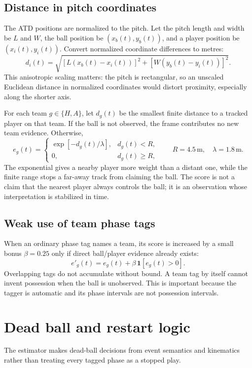 \documentclass[11pt,a4paper]{article}
\begin{document}
\subsection{Distance in pitch coordinates}

The ATD positions are normalized to the pitch. Let the pitch length and width be $L$ and $W$, the
ball position be $(x_b(t),y_b(t))$, and a player position be $(x_i(t),y_i(t))$. Convert normalized
coordinate differences to metres:
\[
  d_i(t)=\sqrt{\left[L(x_b(t)-x_i(t))\right]^2+
                   \left[W(y_b(t)-y_i(t))\right]^2}.
\]
This anisotropic scaling matters: the pitch is rectangular, so an unscaled Euclidean distance in
normalized coordinates would distort proximity, especially along the shorter axis.

For each team $g\in\{H,A\}$, let $d_g(t)$ be the smallest finite distance to a tracked player on
that team. If the ball is not observed, the frame contributes no new team evidence. Otherwise,
\[
  e_g(t)=\begin{cases}
    \exp[-d_g(t)/\lambda], & d_g(t)<R,\\
    0, & d_g(t)\ge R,
  \end{cases}
  \qquad R=4.5\,\mathrm{m},\quad \lambda=1.8\,\mathrm{m}.
\]
The exponential gives a nearby player more weight than a distant one, while the finite range stops
a far-away track from claiming the ball. The score is not a claim that the nearest player always
controls the ball; it is an observation whose interpretation is stabilized in time.

\subsection{Weak use of team phase tags}

When an ordinary phase tag names a team, its score is increased by a small bonus $\beta=0.25$ only
if direct ball/player evidence already exists:
\[
  e'_g(t)=e_g(t)+\beta\,\mathbf{1}[e_g(t)>0].
\]
Overlapping tags do not accumulate without bound. A team tag by itself cannot invent possession
when the ball is unobserved. This is important because the tagger is automatic and its phase
intervals are not possession intervals.

\section{Dead ball and restart logic}

The estimator makes dead-ball decisions from event semantics and kinematics rather than treating
every tagged phase as a stopped play.
\end{document}
